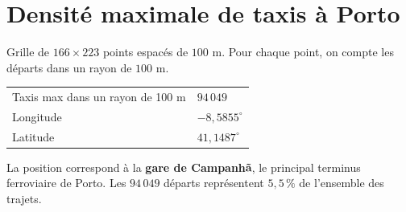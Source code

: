 \section{Densité maximale de taxis à Porto}

Grille de $166 \times 223$ points espacés de $100$ m.
Pour chaque point, on compte les départs dans un rayon de $100$ m.

\begin{center}
\begin{tabular}{ll}
\toprule
Taxis max dans un rayon de 100 m & $94\,049$ \\
Longitude & $-8{,}5855^\circ$ \\
Latitude  & $41{,}1487^\circ$ \\
\bottomrule
\end{tabular}
\end{center}

La position correspond à la \textbf{gare de Campanhã}, le principal terminus
ferroviaire de Porto. Les $94\,049$ départs représentent $5{,}5\,\%$ de
l'ensemble des trajets.
